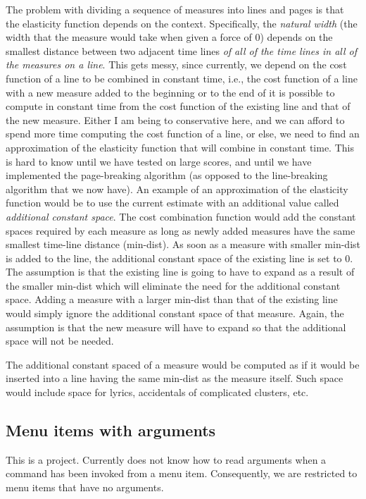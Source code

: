 The problem with dividing a sequence of measures into lines and pages
is that the elasticity function depends on the context.  Specifically,
the \emph{natural width} (the width that the measure would take when
given a force of 0) depends on the smallest distance between two
adjacent time lines \emph{of all of the time lines in all of the
measures on a line}.  This gets messy, since currently, we depend on
the cost function of a line to be combined in constant time, i.e., the
cost function of a line with a new measure added to the beginning or
to the end of it is possible to compute in constant time from the cost
function of the existing line and that of the new measure.  Either I
am being to conservative here, and we can afford to spend more time
computing the cost function of a line, or else, we need to find an
approximation of the elasticity function that will combine in constant
time.  This is hard to know until we have tested {\gs} on large
scores, and until we have implemented the page-breaking algorithm (as
opposed to the line-breaking algorithm that we now have). An example
of an approximation of the elasticity function would be to use the
current estimate with an additional value called \emph{additional
constant space}.  The cost combination function would add the constant
spaces required by each measure as long as newly added measures have
the same smallest time-line distance (min-dist).  As soon as a measure
with smaller min-dist is added to the line, the additional constant
space of the existing line is set to 0.  The assumption is that the
existing line is going to have to expand as a result of the smaller
min-dist which will eliminate the need for the additional constant
space.  Adding a measure with a larger min-dist than that of the
existing line would simply ignore the additional constant space of
that measure.  Again, the assumption is that the new measure will have
to expand so that the additional space will not be needed.

The additional constant spaced of a measure would be computed as if it
would be inserted into a line having the same min-dist as the measure
itself.  Such space would include space for lyrics, accidentals of
complicated clusters, etc. 

\subsection{Menu items with arguments}

This is a {\clim} project.  Currently {\clim} does not know how to
read arguments when a command has been invoked from a menu item.
Consequently, we are restricted to menu items that have no arguments. 

